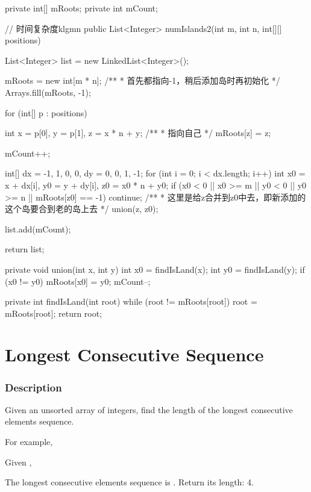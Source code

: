 \begin{Code}
private int[] mRoots;
private int mCount;

// 时间复杂度klgmn
public List<Integer> numIslands2(int m, int n, int[][] positions) {
    List<Integer> list = new LinkedList<Integer>();

    mRoots = new int[m * n];
    /**
     * 首先都指向-1，稍后添加岛时再初始化
     */
    Arrays.fill(mRoots, -1);

    for (int[] p : positions) {
        int x = p[0], y = p[1], z = x * n + y;
        /**
         * 指向自己
         */
        mRoots[z] = z;

        mCount++;

        int[] dx = {-1, 1, 0, 0}, dy = {0, 0, 1, -1};
        for (int i = 0; i < dx.length; i++) {
            int x0 = x + dx[i], y0 = y + dy[i], z0 = x0 * n + y0;
            if (x0 < 0 || x0 >= m || y0 < 0 || y0 >= n || mRoots[z0] == -1) {
                continue;
            }
            /**
             * 这里是给z合并到z0中去，即新添加的这个岛要合到老的岛上去
             */
            union(z, z0);
        }

        list.add(mCount);
    }

    return list;
}

private void union(int x, int y) {
    int x0 = findIsLand(x);
    int y0 = findIsLand(y);
    if (x0 != y0) {
        mRoots[x0] = y0;
        mCount--;
    }
}

private int findIsLand(int root) {
    while (root != mRoots[root]) {
        root = mRoots[root];
    }
    return root;
}
\end{Code}

\newpage

\section{Longest Consecutive Sequence} %

\subsubsection{Description}

Given an unsorted array of integers, find the length of the longest consecutive elements sequence.

For example,

Given \code{[100, 4, 200, 1, 3, 2]},

The longest consecutive elements sequence is \code{[1, 2, 3, 4]}. Return its length: 4.

